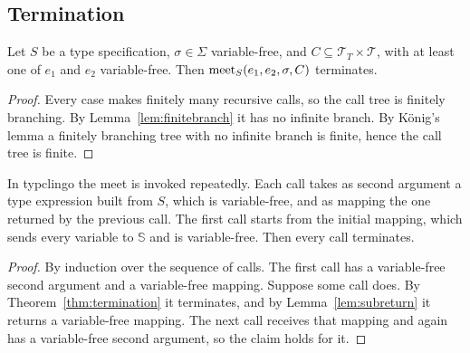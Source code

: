 \documentclass[doc]{subfiles}
\begin{document}
\subsection*{Termination}

\begin{theorem}\label{thm:termination}
	Let $S$ be a type specification, $\sigma \in \Sigma$ variable-free,
	and $C \subseteq \mathcal{T}_T \times \mathcal{T}$,
	with at least one of $e_1$ and $e_2$ variable-free.
	Then $\mathrm{meet}_S(e_1,e_2,\sigma,C)$ terminates.
\end{theorem}

\begin{proof}
	Every case makes finitely many recursive calls, so the call tree is finitely branching.
	By Lemma~\ref{lem:finitebranch} it has no infinite branch.
	By K\"onig's lemma a finitely branching tree with no infinite branch is finite,
	hence the call tree is finite.
\end{proof}

\begin{corollary}
	In typclingo the meet is invoked repeatedly. Each call takes as second argument a
	type expression built from $S$, which is variable-free, and as mapping the one returned
	by the previous call. The first call starts from the initial mapping, which sends every
	variable to $\mathbb{S}$ and is variable-free. Then every call terminates.
\end{corollary}

\begin{proof}
	By induction over the sequence of calls.
	The first call has a variable-free second argument and a variable-free mapping.
	Suppose some call does. By Theorem~\ref{thm:termination} it terminates,
	and by Lemma~\ref{lem:subreturn} it returns a variable-free mapping.
	The next call receives that mapping and again has a variable-free second argument,
	so the claim holds for it.
\end{proof}
\end{document}
